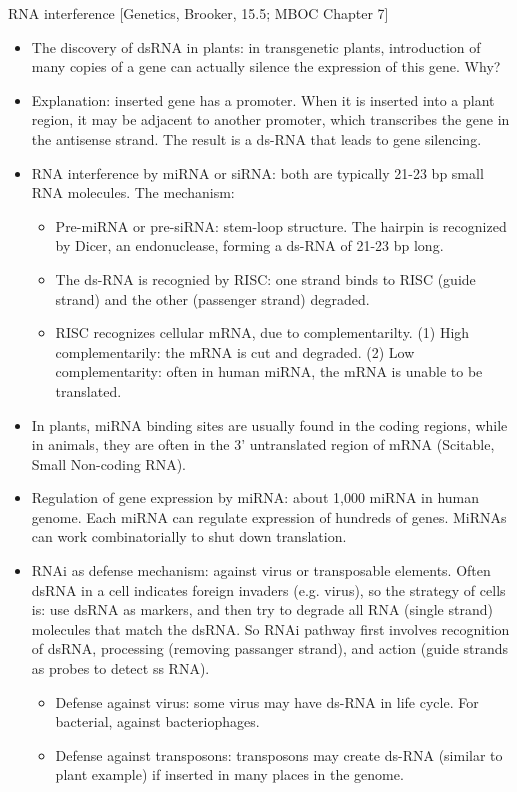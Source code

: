 \documentclass{report}
\begin{document}
RNA interference [Genetics, Brooker, 15.5; MBOC Chapter 7]
\begin{itemize}
	
	\item The discovery of dsRNA in plants: in transgenetic plants, introduction of many copies of a gene can actually silence the expression of this gene. Why? 
	
	\item Explanation: inserted gene has a promoter. When it is inserted into a plant region, it may be adjacent to another promoter, which transcribes the gene in the antisense strand. The result is a ds-RNA that leads to gene silencing. 
	
	\item RNA interference by miRNA or siRNA: both are typically 21-23 bp small RNA molecules. The mechanism: 
	\begin{itemize}
		\item Pre-miRNA or pre-siRNA: stem-loop structure. The hairpin is recognized by Dicer, an endonuclease, forming a ds-RNA of 21-23 bp long. 
		\item The ds-RNA is recognied by RISC: one strand binds to RISC (guide strand) and the other (passenger strand) degraded. 
		\item RISC recognizes cellular mRNA, due to complementarilty. (1) High complementarily: the mRNA is cut and degraded. (2) Low complementarity: often in human miRNA, the mRNA is unable to be translated.
	\end{itemize}
	
	\item In plants, miRNA binding sites are usually found in the coding regions, while in animals, they are often in the 3' untranslated region of mRNA (Scitable, Small Non-coding RNA). 
	
	\item Regulation of gene expression by miRNA: about 1,000 miRNA in human genome. Each miRNA can regulate expression of hundreds of genes. MiRNAs can work combinatorially to shut down translation. 
	
	\item RNAi as defense mechanism: against virus or transposable elements. Often dsRNA in a cell indicates foreign invaders (e.g. virus), so the strategy of cells is: use dsRNA as markers, and then try to degrade all RNA (single strand) molecules that match the dsRNA. So RNAi pathway first involves recognition of dsRNA, processing (removing passanger strand), and action (guide strands as probes to detect ss RNA).   
	\begin{itemize}
		\item Defense against virus: some virus may have ds-RNA in life cycle. For bacterial, against bacteriophages.  
		\item Defense against transposons: transposons may create ds-RNA (similar to plant example) if inserted in many places in the genome.
	\end{itemize}
\end{itemize}
\end{document}
